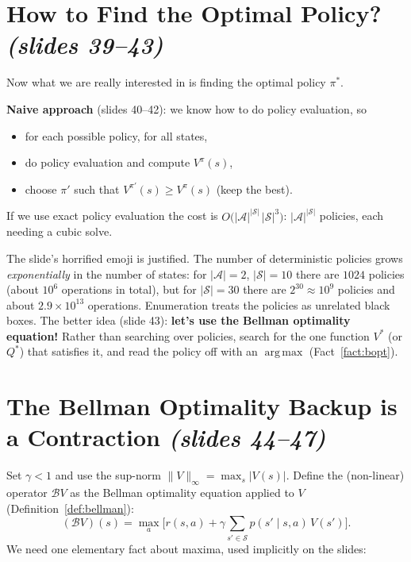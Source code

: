 \documentclass[11pt,a4paper]{article}
\newcommand{\cS}{\mathcal{S}}
\newcommand{\cA}{\mathcal{A}}
\newcommand{\Bell}{\mathcal{B}}
\newcommand{\norm}[1]{\lVert #1\rVert_\infty}
\newcommand{\abs}[1]{\left\lvert #1\right\rvert}
\DeclareMathOperator*{\argmax}{arg\,max}
\newcommand{\slides}[1]{\texorpdfstring{\emph{(slides #1)}}{(slides #1)}}
\theoremstyle{plain}
\theoremstyle{definition}
\theoremstyle{remark}
\begin{document}
\section{How to Find the Optimal Policy? \slides{39--43}}
Now what we are really interested in is finding the optimal policy $\pi^*$.

\textbf{Naive approach} (slides 40--42): we know how to do policy evaluation, so
\begin{itemize}
  \item for each possible policy, for all states,
  \item do policy evaluation and compute $V^\pi(s)$,
  \item choose $\pi'$ such that $V^{\pi'}(s)\ge V^\pi(s)$ (keep the best).
\end{itemize}
If we use exact policy evaluation the cost is $O\big(|\cA|^{|\cS|}\,|\cS|^3\big)$: $|\cA|^{|\cS|}$ policies, each needing a cubic solve.

\begin{intuition}
The slide's horrified emoji is justified. The number of deterministic policies grows \emph{exponentially} in the number of states: for $|\cA|=2$, $|\cS|=10$ there are $1024$ policies (about $10^6$ operations in total), but for $|\cS|=30$ there are $2^{30}\approx10^9$ policies and about $2.9\times10^{13}$ operations. Enumeration treats the policies as unrelated black boxes. The better idea (slide 43): \textbf{let's use the Bellman optimality equation!} Rather than searching over policies, search for the one function $V^*$ (or $Q^*$) that satisfies it, and read the policy off with an $\argmax$ (Fact~\ref{fact:bopt}).
\end{intuition}

\section{The Bellman Optimality Backup is a Contraction \slides{44--47}}\label{sec:optcontr}
Set $\gamma<1$ and use the sup-norm $\norm{V}=\max_s\abs{V(s)}$. Define the (non-linear) operator $\Bell V$ as the Bellman optimality equation applied to $V$ (Definition~\ref{def:bellman}):
\[
(\Bell V)(s)=\max_a\Big[r(s,a)+\gamma\sum_{s'\in\cS}p(s'\mid s,a)\,V(s')\Big].
\]
We need one elementary fact about maxima, used implicitly on the slides:
\end{document}
